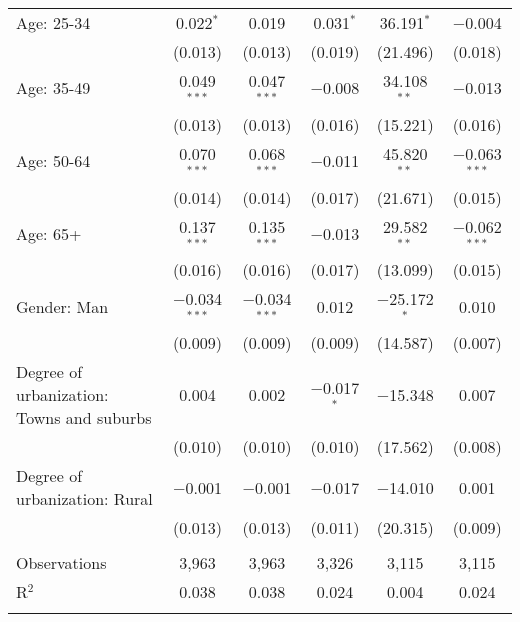 \begin{tabular}{@{\extracolsep{5pt}}lccccc}
  Age: 25\mbox{-}34 & 0.022$^{*}$ & 0.019 & 0.031$^{*}$ & 36.191$^{*}$ & $-$0.004 \\ 
  & (0.013) & (0.013) & (0.019) & (21.496) & (0.018) \\ 
  Age: 35\mbox{-}49 & 0.049$^{***}$ & 0.047$^{***}$ & $-$0.008 & 34.108$^{**}$ & $-$0.013 \\ 
  & (0.013) & (0.013) & (0.016) & (15.221) & (0.016) \\ 
  Age: 50\mbox{-}64 & 0.070$^{***}$ & 0.068$^{***}$ & $-$0.011 & 45.820$^{**}$ & $-$0.063$^{***}$ \\ 
  & (0.014) & (0.014) & (0.017) & (21.671) & (0.015) \\ 
  Age: 65+ & 0.137$^{***}$ & 0.135$^{***}$ & $-$0.013 & 29.582$^{**}$ & $-$0.062$^{***}$ \\ 
  & (0.016) & (0.016) & (0.017) & (13.099) & (0.015) \\ 
  Gender: Man & $-$0.034$^{***}$ & $-$0.034$^{***}$ & 0.012 & $-$25.172$^{*}$ & 0.010 \\ 
  & (0.009) & (0.009) & (0.009) & (14.587) & (0.007) \\ 
  Degree of urbanization: Towns and suburbs & 0.004 & 0.002 & $-$0.017$^{*}$ & $-$15.348 & 0.007 \\ 
  & (0.010) & (0.010) & (0.010) & (17.562) & (0.008) \\ 
  Degree of urbanization: Rural & $-$0.001 & $-$0.001 & $-$0.017 & $-$14.010 & 0.001 \\ 
  & (0.013) & (0.013) & (0.011) & (20.315) & (0.009) \\ 
 \hline \\[-1.8ex] 

Observations & 3,963 & 3,963 & 3,326 & 3,115 & 3,115 \\ 
R$^{2}$ & 0.038 & 0.038 & 0.024 & 0.004 & 0.024 \\ 
\hline 
\hline \\[-1.8ex] 
\end{tabular} 